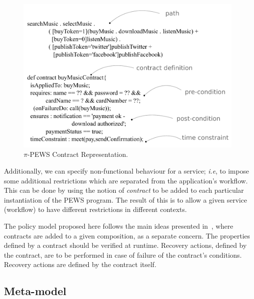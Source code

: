 


\begin{figure}[ht!] 
\centering
\includegraphics[width=.9\textwidth]{chapters/methodology/figs/pewsEspecificationContract.pdf}
\caption{$\pi$-PEWS Contract Representation.}
\label{fig:contractRepresentation}
\end{figure}

Additionally, we can specify non-functional behaviour for a service;
\textit{i.e}, to impose some additional restrictions which are separated from 
the application's workflow. This can be done by
using the notion of \textit{contract} to be added to each particular instantiation of
the PEWS program. The result of this is to allow a given service (workflow) to
have different restrictions in different contexts.



The policy model proposed here follows the main ideas presented
in~\cite{Espinosa-OviedoVZC09,PortillaHE08}, where contracts are added to a
given composition, as a separate concern. The properties defined by a contract
should be verified at runtime. Recovery actions, defined by the contract, are to
be performed in case of failure of the contract's conditions. Recovery actions
are defined by the contract itself.


\subsection{Meta-model}


